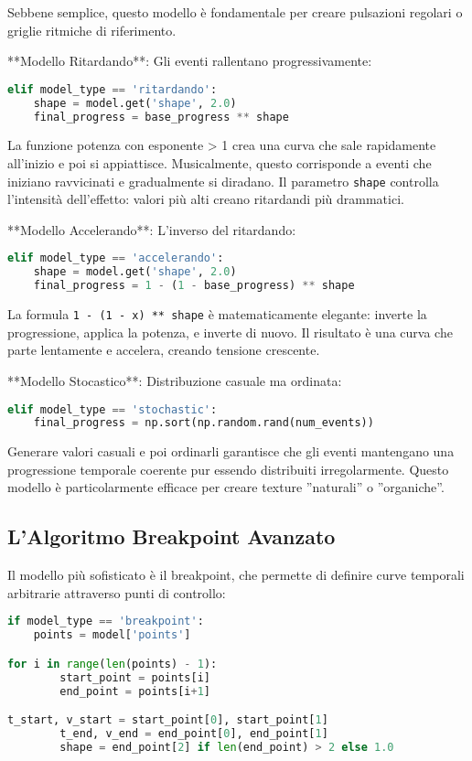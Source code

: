 Sebbene semplice, questo modello è fondamentale per creare pulsazioni regolari o griglie ritmiche di riferimento.

**Modello Ritardando**: Gli eventi rallentano progressivamente:
\begin{lstlisting}[language=Python]
elif model_type == 'ritardando':
    shape = model.get('shape', 2.0)
    final_progress = base_progress ** shape
\end{lstlisting}

La funzione potenza con esponente > 1 crea una curva che sale rapidamente all'inizio e poi si appiattisce. Musicalmente, questo corrisponde a eventi che iniziano ravvicinati e gradualmente si diradano. Il parametro \texttt{shape} controlla l'intensità dell'effetto: valori più alti creano ritardandi più drammatici.

**Modello Accelerando**: L'inverso del ritardando:
\begin{lstlisting}[language=Python]
elif model_type == 'accelerando':
    shape = model.get('shape', 2.0)
    final_progress = 1 - (1 - base_progress) ** shape
\end{lstlisting}

La formula \texttt{1 - (1 - x) ** shape} è matematicamente elegante: inverte la progressione, applica la potenza, e inverte di nuovo. Il risultato è una curva che parte lentamente e accelera, creando tensione crescente.

**Modello Stocastico**: Distribuzione casuale ma ordinata:
\begin{lstlisting}[language=Python]
elif model_type == 'stochastic':
    final_progress = np.sort(np.random.rand(num_events))
\end{lstlisting}

Generare valori casuali e poi ordinarli garantisce che gli eventi mantengano una progressione temporale coerente pur essendo distribuiti irregolarmente. Questo modello è particolarmente efficace per creare texture ''naturali'' o ''organiche''.
\subsection{L'Algoritmo Breakpoint Avanzato}
Il modello più sofisticato è il breakpoint, che permette di definire curve temporali arbitrarie attraverso punti di controllo:

\begin{lstlisting}[language=Python]
if model_type == 'breakpoint':
    points = model['points']

for i in range(len(points) - 1):
        start_point = points[i]
        end_point = points[i+1]

t_start, v_start = start_point[0], start_point[1]
        t_end, v_end = end_point[0], end_point[1]
        shape = end_point[2] if len(end_point) > 2 else 1.0
\end{lstlisting}

